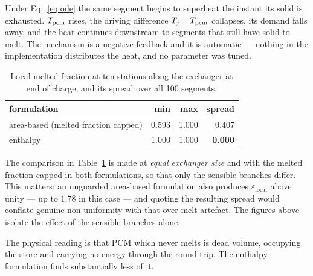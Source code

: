 Under Eq.~\eqref{eq:ode} the same segment begins to superheat the instant its
solid is exhausted. $T_{\mathrm{pcm}}$ rises, the driving difference $T_{j}-T_{\mathrm{pcm}}$
collapses, its demand falls away, and the heat continues downstream to segments
that still have solid to melt. The mechanism is a negative feedback and it is
automatic --- nothing in the implementation distributes the heat, and no
parameter was tuned.

\begin{table}[htbp]
\centering
\caption{Local melted fraction at ten stations along the exchanger at end of
charge, and its spread over all \num{100} segments.}
\label{tab:levelling}
\begin{tabular}{@{}l r r r@{}}
\toprule
formulation & min & max & spread \\
\midrule
area-based (melted fraction capped) & 0.593 & 1.000 & 0.407 \\
enthalpy                            & 1.000 & 1.000 & \textbf{0.000} \\
\bottomrule
\end{tabular}
\end{table}

The comparison in Table~\ref{tab:levelling} is made at \emph{equal exchanger
size} and with the melted fraction capped in both formulations, so that only the
sensible branches differ. This matters: an unguarded area-based formulation also
produces $\varepsilon_{\mathrm{local}}$ above unity --- up to $1.78$ in this
case --- and quoting the resulting spread would conflate genuine non-uniformity
with that over-melt artefact. The figures above isolate the effect of the
sensible branches alone.

The physical reading is that PCM which never melts is dead volume, occupying the
store and carrying no energy through the round trip. The enthalpy formulation
finds substantially less of it.

